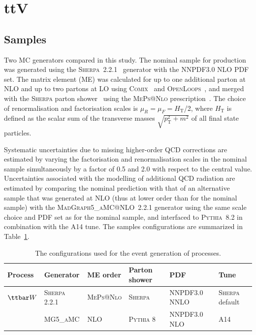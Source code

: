 \section{ttV}
\label{sec:ttV}


\subsection{Samples}
Two MC generators compared in this study.
The nominal sample for \ttW production was generated using the \textsc{Sherpa}~2.2.1~\cite{sherpa} generator with the NNPDF3.0 NLO PDF set.
The matrix element (ME) was calculated for up to one additional parton at NLO and up to two partons at LO using
\textsc{Comix}~\cite{Gleisberg:2008fv} and \textsc{OpenLoops}~\cite{Cascioli:2011va}, and merged with the \textsc{Sherpa} parton shower~\cite{Schumann:2007mg} using the \textsc{MePs@Nlo} prescription~\cite{Hoeche:2012yf}.
The choice of renormalisation and factorisation scales is $\mu_R = \mu_F = H_\textrm{T}$/2, where $H_\textrm{T}$ is defined as the scalar sum of the transverse masses $\sqrt{p_\textrm{T}^2+m^2}$ of all final state particles.



Systematic uncertainties due to missing higher-order QCD corrections are estimated by varying the factorisation and renormalisation scales in the nominal sample simultaneously by a factor of 0.5 and 2.0 with respect to the central value. 
Uncertainties associated with the modelling of additional QCD radiation are estimated by comparing the nominal \ttW prediction with that of an alternative sample that was generated at NLO (thus at lower order than for the nominal sample) with the \textsc{MadGraph5\_aMC@NLO}~2.2.1 generator using the same scale choice and PDF set as for the nominal sample, and interfaced to \textsc{Pythia}~8.2 in combination with the A14 tune. 
The samples configurations are summarized in Table~\ref{tab:mcconfig}.
\begin{table}
\begin{center}
\caption{\label{tab:mcconfig}
The configurations used for the event generation of \ttW processes.}
\vspace{0.25cm}
{\small
\setlength\tabcolsep{1.5pt}
\begin{tabular}{llllll}
\hline\hline
Process & Generator & ME order & Parton shower & PDF & Tune  \\
\hline
$\ttbar W$  & \textsc{Sherpa 2.2.1} & \textsc{MePs@Nlo} & \textsc{Sherpa} &  NNPDF3.0 NNLO & \textsc{Sherpa} default \\
& \textsc{MG5\_aMC} & NLO & \textsc{Pythia} 8 & NNPDF3.0 NLO & A14   \\
\hline\hline
\end{tabular}
}
\end{center}
\end{table}



